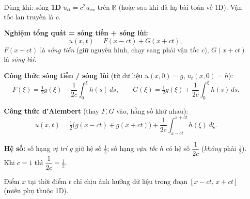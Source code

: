 \begin{dieukienbox}
Dùng khi: sóng \textbf{1D} $u_{tt}=c^2 u_{xx}$ trên $\mathbb{R}$ (hoặc sau khi đã hạ bài toán về 1D). Vận tốc lan truyền là $c$.
\end{dieukienbox}

\begin{nhobox}
\textbf{Nghiệm tổng quát = sóng tiến + sóng lùi:}
\[
  u(x,t)=F(x-ct)+G(x+ct),
\]
$F(x-ct)$ là \emph{sóng tiến} (giữ nguyên hình, chạy sang phải vận tốc $c$), $G(x+ct)$ là \emph{sóng lùi}.

\textbf{Công thức sóng tiến / sóng lùi} (từ dữ liệu $u(x,0)=g$, $u_t(x,0)=h$):
\[
  F(\xi)=\tfrac12 g(\xi)-\frac{1}{2c}\!\int_0^{\xi}\! h(s)\,ds,\qquad
  G(\xi)=\tfrac12 g(\xi)+\frac{1}{2c}\!\int_0^{\xi}\! h(s)\,ds.
\]

\textbf{Công thức d'Alembert} (thay $F,G$ vào, hằng số khử nhau):
\[
  u(x,t)=\tfrac12\big(g(x-ct)+g(x+ct)\big)+\frac{1}{2c}\int_{x-ct}^{x+ct} h(\xi)\,d\xi .
\]
\end{nhobox}

\begin{luuybox}
\textbf{Hệ số:} số hạng \emph{vị trí} $g$ giữ hệ số $\tfrac12$; số hạng \emph{vận tốc} $h$ có hệ số $\dfrac{1}{2c}$ (\emph{không} phải $\tfrac12$). Khi $c=1$ thì $\dfrac{1}{2c}=\tfrac12$.
\end{luuybox}

\begin{meobox}
Điểm $x$ tại thời điểm $t$ chỉ chịu ảnh hưởng dữ liệu trong đoạn $[x-ct,\,x+ct]$ (miền phụ thuộc 1D).
\end{meobox}
